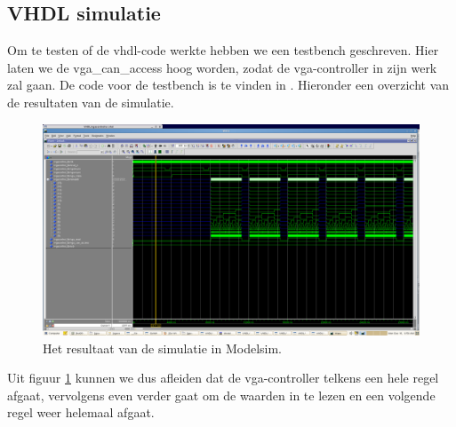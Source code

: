 \documentclass{scrartcl}  %
\begin{document}
\subsection{VHDL simulatie}
Om te testen of de vhdl-code werkte hebben we een testbench geschreven. Hier laten we de vga\_can\_access hoog worden, zodat de vga-controller in zijn werk zal gaan. De code voor de testbench is te vinden in . Hieronder een overzicht van de resultaten van de simulatie.
\begin{figure}[H]
\centering
		\includegraphics[width=1\textwidth]{images/simmodvgafinal.png}
		
		\caption{Het resultaat van de simulatie in Modelsim.}
		\label{vgafig:sim}
\end{figure}
Uit figuur \ref{vgafig:sim} kunnen we dus afleiden dat de vga-controller telkens een hele regel afgaat, vervolgens even verder gaat om de waarden in te lezen en een volgende regel weer helemaal afgaat. 
\end{document}
